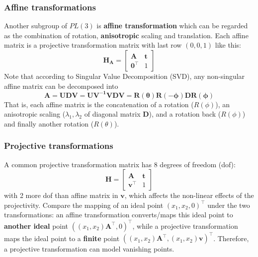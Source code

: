 \documentclass[12pt]{article}
\numberwithin{equation}{section}
\begin{document}
\subsubsection{Affine transformations}

Another subgroup of $PL(3)$ is \textbf{affine transformation} which can be regarded as the combination of rotation, \textbf{anisotropic} scaling and translation. Each affine matrix is a projective transformation matrix with last row $(0, 0, 1)$ like this:
\begin{equation*}
\mathbf{H_A} = 
\begin{bmatrix}
\mathbf{A} & \mathbf{t} \\
\mathbf{0}^\top & 1
\end{bmatrix}
\end{equation*}
Note that according to Singular Value Decomposition (SVD), any non-singular affine matrix can be decomposed into 
\begin{equation*}
\mathbf{A} = \mathbf{UDV} = \mathbf{UV^{-1}VDV} = \mathbf{R(\theta) R(-\phi)DR(\phi)}
\end{equation*}
That is, each affine matrix is the concatenation of a rotation ($R(\phi)$), an anisotropic scaling ($\lambda_1, \lambda_2$ of diagonal matrix $\mathbf{D}$), and a rotation back ($R(\phi)$) and finally another rotation ($R(\theta)$).

\subsubsection{Projective transformations}
\label{sec:proj_trans}
A common projective transformation matrix has 8 degrees of freedom (dof):
\begin{equation*}
\mathbf{H} = 
\begin{bmatrix}
\mathbf{A} & \mathbf{t} \\
\mathbf{v}^\top & 1
\end{bmatrix}
\end{equation*}
with 2 more dof than affine matrix in $\mathbf{v}$, which affects the non-linear effects of the projectivity. Compare the mapping of an ideal point $(x_1, x_2, 0)^\top$ under the two transformations: an affine transformation converts/maps this ideal point to \textbf{another ideal} point $((x_1,x_2)\mathbf{A}^\top, 0)^\top$, while a projective transformation maps the ideal point to a \textbf{finite} point $((x_1,x_2)\mathbf{A}^\top, (x_1,x_2)\mathbf{v})^\top$. Therefore, a projective transformation can model vanishing points.
\end{document}
